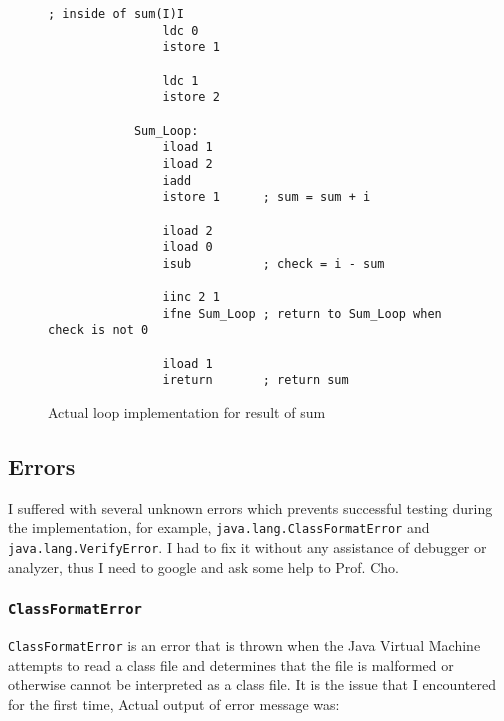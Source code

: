 \documentclass[a4paper, 12pt]{article}
\begin{document}
        \begin{figure}[H]
            \begin{lstlisting}[gobble=8]
            ; inside of sum(I)I
                ldc 0
                istore 1
            
                ldc 1
                istore 2
            
            Sum_Loop:
                iload 1     
                iload 2
                iadd
                istore 1      ; sum = sum + i
                
                iload 2
                iload 0
                isub          ; check = i - sum
            
                iinc 2 1
                ifne Sum_Loop ; return to Sum_Loop when check is not 0
            
                iload 1
                ireturn       ; return sum
            \end{lstlisting}
    
            \centering        
            \caption{Actual loop implementation for result of sum}
        \end{figure}
        
        \subsection{Errors}
        I suffered with several unknown errors which prevents successful testing during the implementation, for example, \texttt{java.lang.ClassFormatError} and \texttt{java.lang.VerifyError}. I had to fix it without any assistance of debugger or analyzer, thus I need to google and ask some help to Prof. Cho. 
    
            \subsubsection{\texttt{ClassFormatError}}
            \texttt{ClassFormatError} is an error that is thrown when the Java Virtual Machine attempts to read a class file and determines that the file is malformed or otherwise cannot be interpreted as a class file. \cite{website:oracle_cfe} It is the issue that I encountered for the first time, Actual output of error message was:
            
\end{document}

